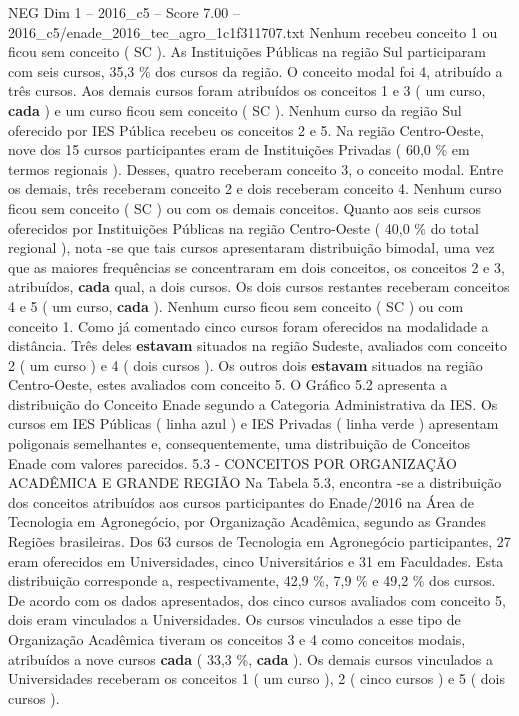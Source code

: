 \begin{textsample}{NEG Dim 1 – 2016\_c5 – Score 7.00 – 2016\_c5/enade\_2016\_tec\_agro\_1c1f311707.txt}
Nenhum recebeu conceito 1 ou ficou sem conceito ( SC ).
As Instituições Públicas na região Sul participaram com seis cursos, 35,3 \% dos cursos da região.
O conceito modal foi 4, atribuído a três cursos.
Aos demais cursos foram atribuídos os conceitos 1 e 3 ( um curso, \textbf{cada} ) e um curso ficou sem conceito ( SC ).
Nenhum curso da região Sul oferecido por IES Pública recebeu os conceitos 2 e 5.
Na região Centro-Oeste, nove dos 15 cursos participantes eram de Instituições Privadas ( 60,0 \% em termos regionais ).
Desses, quatro receberam conceito 3, o conceito modal.
Entre os demais, três receberam conceito 2 e dois receberam conceito 4.
Nenhum curso ficou sem conceito ( SC ) ou com os demais conceitos.
Quanto aos seis cursos oferecidos por Instituições Públicas na região Centro-Oeste ( 40,0 \% do total regional ), nota -se que tais cursos apresentaram distribuição bimodal, uma vez que as maiores frequências se concentraram em dois conceitos, os conceitos 2 e 3, atribuídos, \textbf{cada} qual, a dois cursos.
Os dois cursos restantes receberam conceitos 4 e 5 ( um curso, \textbf{cada} ).
Nenhum curso ficou sem conceito ( SC ) ou com conceito 1.
Como já comentado cinco cursos foram oferecidos na modalidade a distância.
Três deles \textbf{estavam} situados na região Sudeste, avaliados com conceito 2 ( um curso ) e 4 ( dois cursos ).
Os outros dois \textbf{estavam} situados na região Centro-Oeste, estes avaliados com conceito 5.
O Gráfico 5.2 apresenta a distribuição do Conceito Enade segundo a Categoria Administrativa da IES.
Os cursos em IES Públicas ( linha azul ) e IES Privadas ( linha verde ) apresentam poligonais semelhantes e, consequentemente, uma distribuição de Conceitos Enade com valores parecidos. 5.3 - CONCEITOS POR ORGANIZAÇÃO ACADÊMICA E GRANDE REGIÃO Na Tabela 5.3, encontra -se a distribuição dos conceitos atribuídos aos cursos participantes do Enade/2016 na Área de Tecnologia em Agronegócio, por Organização Acadêmica, segundo as Grandes Regiões brasileiras.
Dos 63 cursos de Tecnologia em Agronegócio participantes, 27 eram oferecidos em Universidades, cinco Universitários e 31 em Faculdades.
Esta distribuição corresponde a, respectivamente, 42,9 \%, 7,9 \% e 49,2 \% dos cursos.
De acordo com os dados apresentados, dos cinco cursos avaliados com conceito 5, dois eram vinculados a Universidades.
Os cursos vinculados a esse tipo de Organização Acadêmica tiveram os conceitos 3 e 4 como conceitos modais, atribuídos a nove cursos \textbf{cada} ( 33,3 \%, \textbf{cada} ).
Os demais cursos vinculados a Universidades receberam os conceitos 1 ( um curso ), 2 ( cinco cursos ) e 5 ( dois cursos ).

\end{textsample}
